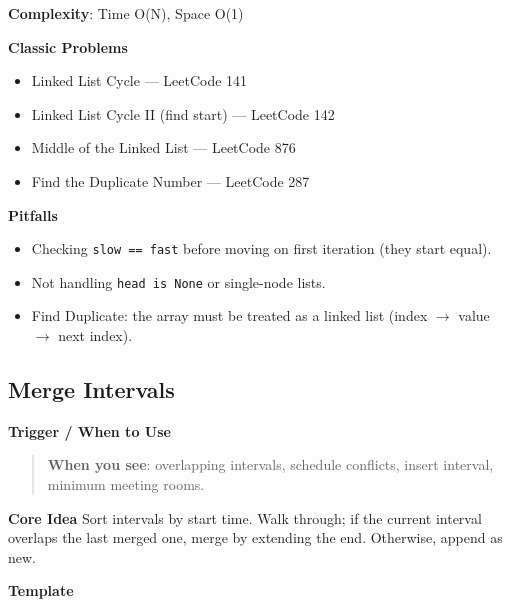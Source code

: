 \documentclass[11pt]{article}
\providecommand{\tightlist}{\setlength{\itemsep}{1pt}\setlength{\parskip}{0pt}}
\begin{document}
\textbf{Complexity}: Time O(N), Space O(1)

\textbf{Classic Problems}

\begin{itemize}
\tightlist
\item
  Linked List Cycle --- LeetCode 141
\item
  Linked List Cycle II (find start) --- LeetCode 142
\item
  Middle of the Linked List --- LeetCode 876
\item
  Find the Duplicate Number --- LeetCode 287
\end{itemize}

\textbf{Pitfalls}

\begin{itemize}
\tightlist
\item
  Checking \texttt{slow\ ==\ fast} before moving on first iteration (they start equal).
\item
  Not handling \texttt{head\ is\ None} or single-node lists.
\item
  Find Duplicate: the array must be treated as a linked list (index \(\rightarrow\) value \(\rightarrow\) next index).
\end{itemize}

\subsection{Merge Intervals}\label{merge-intervals}

\textbf{Trigger / When to Use}

\begin{quote}
\textbf{When you see}: overlapping intervals, schedule conflicts, insert interval, minimum meeting rooms.
\end{quote}

\textbf{Core Idea}
Sort intervals by start time. Walk through; if the current interval overlaps the last merged one, merge by extending the end. Otherwise, append as new.

\textbf{Template}

\end{document}
